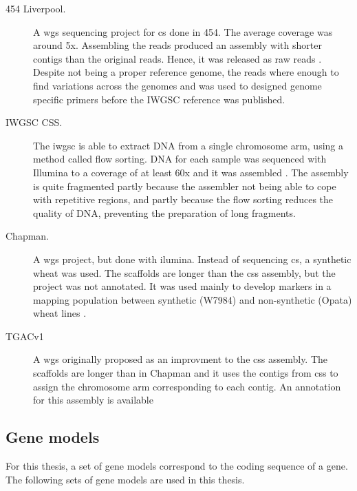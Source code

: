 \begin{description}
\item[454 Liverpool.] A \gls{wgs} sequencing project for \gls{cs} done in 454. The average coverage was around 5x. Assembling the reads produced an assembly with shorter contigs than the original reads. Hence, it was released as raw reads \citep{Brenchley2012}. Despite not being a proper reference genome, the reads where enough to find variations across the genomes and was used to designed genome specific primers before the IWGSC reference was published. 
\item[IWGSC CSS.] The \gls{iwgsc} is able to extract DNA from a single chromosome arm, using a method called flow sorting. DNA for each sample was sequenced with Illumina to a coverage of at least 60x and it was assembled \citep{Mayer2014}. The assembly is quite fragmented partly because the assembler not being able to cope with repetitive regions, and partly because the flow sorting reduces the quality of DNA, preventing the preparation of long fragments. 
\item[Chapman.] A \gls{wgs} project, but done with ilumina. Instead of sequencing \gls{cs}, a synthetic wheat was used. The scaffolds are longer than the \gls{css} assembly, but the project was not annotated. It was used mainly to develop markers in a mapping population between synthetic (W7984) and non-synthetic (Opata) wheat lines \citep{Chapman2015}.   
\item[TGACv1] A \gls{wgs} originally proposed as an improvment to the \gls{css} assembly. The scaffolds are longer than in Chapman and it uses the contigs from \gls{css} to assign the chromosome arm corresponding to each contig. An annotation for this assembly is available \citep{Clark2016}
\end{description}


\subsection{Gene models}

For this thesis, a set of gene models correspond to the coding sequence of a gene. 
The following sets of gene models are used in this thesis. 

